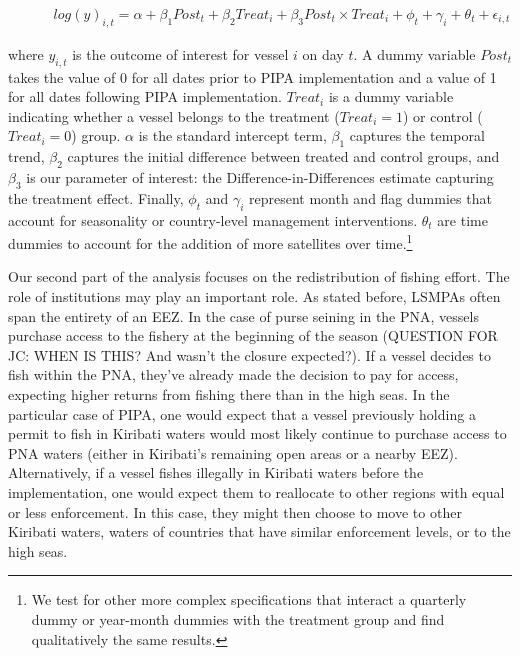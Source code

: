 \documentclass[9pttwoside,lineno]{pnas-new}
\begin{document}
\begin{figure}[h]
\begin{align*}
log(y)_{i,t} = \alpha + \beta_1 Post_t + \beta_2 Treat_i + \beta_3 Post_t \times Treat_i + \phi_t + \gamma_i + \theta_t + \epsilon_{i,t}
\label{eqn:did}
\end{align*}
\end{figure}

where \(y_{i,t}\) is the outcome of interest for vessel \(i\) on day \(t\). A dummy variable \(Post_t\) takes the value of 0 for all
dates prior to PIPA implementation and a value of 1 for all dates
following PIPA implementation. \(Treat_i\) is a dummy
variable indicating whether a vessel belongs to the treatment (\(Treat_i = 1\)) or control
(\(Treat_i = 0\)) group. \(\alpha\) is
the standard intercept term, \(\beta_1\) captures the temporal trend,
\(\beta_2\) captures the initial difference between treated and control groups,
and \(\beta_3\) is our parameter of interest: the Difference-in-Differences estimate capturing
the treatment effect. Finally, \(\phi_t\) and \(\gamma_i\) represent
month and flag dummies that account for seasonality or
country-level management interventions. \(\theta_t\) are time dummies to
account for the addition of more satellites over time.\footnote{We test for other more complex specifications that interact a quarterly dummy or year-month dummies with the treatment group and find qualitatively the same results.}

Our second part of the analysis focuses on the redistribution of fishing
effort. The role of institutions may play an important role. As stated
before, LSMPAs often span the entirety of an EEZ. In the case of purse
seining in the PNA, vessels purchase access to the fishery at the
beginning of the season (QUESTION FOR JC: WHEN IS THIS? And wasn't the closure expected?). If a vessel decides to fish within the PNA,
they've already made the decision to pay for access, expecting higher
returns from fishing there than in the high seas. In the particular case
of PIPA, one would expect that a vessel previously holding a permit to fish in
Kiribati waters would 
most likely continue to purchase access to PNA waters (either in Kiribati's remaining open areas or a nearby EEZ). Alternatively, if a vessel fishes illegally
in Kiribati waters before the implementation, one would expect them to
reallocate to other regions with equal or less enforcement. In this
case, they might then choose to move to other Kiribati waters, waters
of countries that have similar enforcement levels, or to the high seas.
\end{document}
